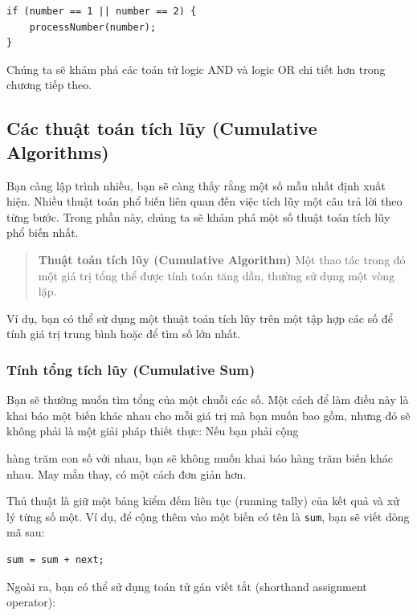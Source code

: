 \begin{verbatim}
if (number == 1 || number == 2) {
    processNumber(number);
}
\end{verbatim}

Chúng ta sẽ khám phá các toán tử logic AND và logic OR chi tiết hơn
trong chương tiếp theo.

\subsection{Các thuật toán tích lũy (Cumulative
Algorithms)}\label{cuxe1c-thuux1eadt-touxe1n-tuxedch-lux169y-cumulative-algorithms-1}

Bạn càng lập trình nhiều, bạn sẽ càng thấy rằng một số mẫu nhất định
xuất hiện. Nhiều thuật toán phổ biến liên quan đến việc tích lũy một câu
trả lời theo từng bước. Trong phần này, chúng ta sẽ khám phá một số
thuật toán tích lũy phổ biến nhất.

\begin{quote}
\textbf{Thuật toán tích lũy (Cumulative Algorithm)} Một thao tác trong
đó một giá trị tổng thể được tính toán tăng dần, thường sử dụng một vòng
lặp.
\end{quote}

Ví dụ, bạn có thể sử dụng một thuật toán tích lũy trên một tập hợp các
số để tính giá trị trung bình hoặc để tìm số lớn nhất.

\subsubsection{Tính tổng tích lũy (Cumulative
Sum)}\label{tuxednh-tux1ed5ng-tuxedch-lux169y-cumulative-sum}

Bạn sẽ thường muốn tìm tổng của một chuỗi các số. Một cách để làm điều
này là khai báo một biến khác nhau cho mỗi giá trị mà bạn muốn bao gồm,
nhưng đó sẽ không phải là một giải pháp thiết thực: Nếu bạn phải cộng

hàng trăm con số với nhau, bạn sẽ không muốn khai báo hàng trăm biến
khác nhau. May mắn thay, có một cách đơn giản hơn.

Thủ thuật là giữ một bảng kiểm đếm liên tục (running tally) của kết quả
và xử lý từng số một. Ví dụ, để cộng thêm vào một biến có tên là
\texttt{sum}, bạn sẽ viết dòng mã sau:

\begin{verbatim}
sum = sum + next;
\end{verbatim}

Ngoài ra, bạn có thể sử dụng toán tử gán viết tắt (shorthand assignment
operator):

